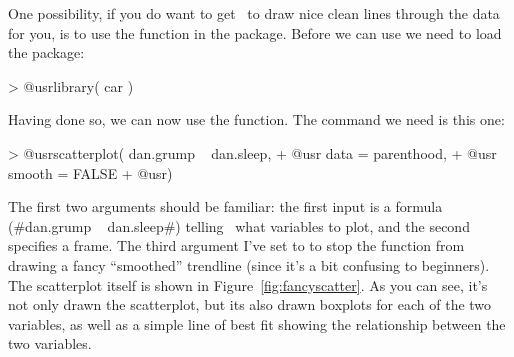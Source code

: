 One possibility, if you do want to get \R\ to draw nice clean lines through the data for you, is to use the  function in the  package. Before we can use  we need to load the package:
\begin{rblock1}
> @usr{library( car )}
\end{rblock1}
Having done so, we can now use the function. The command we need is this one:
\begin{rblock1}
> @usr{scatterplot( dan.grump ~ dan.sleep,}
+ @usr{             data = parenthood, }
+ @usr{             smooth = FALSE}
+ @usr{)}
\end{rblock1}
The first two arguments should be familiar: the first input is a formula (\rtextverb#dan.grump ~ dan.sleep#) telling \R\ what variables to plot, and the second specifies a  frame. The third argument  I've set to  to stop the  function from drawing a fancy ``smoothed'' trendline (since it's a bit confusing to beginners). The scatterplot itself is shown in Figure~\ref{fig:fancyscatter}. As you can see, it's not only drawn the scatterplot, but its also drawn boxplots for each of the two variables, as well as a simple line of best fit showing the relationship between the two variables. 







 



